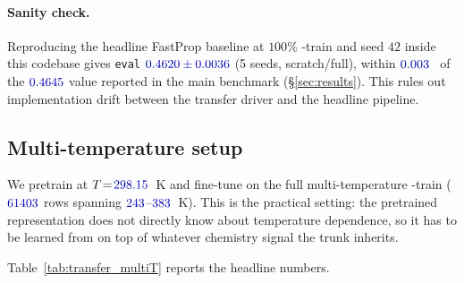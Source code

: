 \paragraph{Sanity check.}  Reproducing the headline FastProp
baseline at $100$\% \scthree{}-train and seed $42$ inside this
codebase gives \texttt{eval} \RMSE{} $\numval{0.4620 \pm 0.0036}$
(5 seeds, scratch/full), within $\numval{0.003}$~\logS{} of the
$\numval{0.4645}$ value reported in the main benchmark
(§\ref{sec:results}).  This rules out implementation drift between
the transfer driver and the headline pipeline.

\subsection{Multi-temperature setup}
\label{sec:transfer_multiT}

We pretrain at $T \! = \! \numval{298.15}$~K and fine-tune on the
full multi-temperature \scthree{}-train ($\numval{61403}$ rows
spanning $\numval{243}$--$\numval{383}$~K).  This is the practical
setting: the pretrained representation does not directly know about
temperature dependence, so it has to be learned from \scthree{} on
top of whatever chemistry signal the trunk inherits.

Table~\ref{tab:transfer_multiT} reports the headline numbers.

